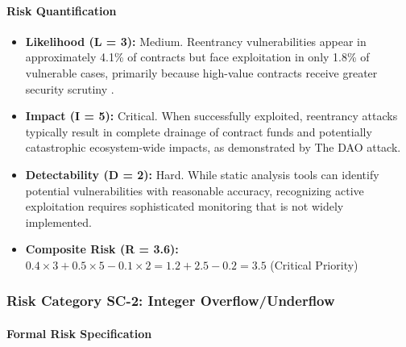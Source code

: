 \paragraph{Risk Quantification}

\begin{itemize}
\item \textbf{Likelihood (L = 3):} Medium. Reentrancy vulnerabilities appear in approximately 4.1\% of contracts but face exploitation in only 1.8\% of vulnerable cases, primarily because high-value contracts receive greater security scrutiny \cite{perez2021analysis}.

\item \textbf{Impact (I = 5):} Critical. When successfully exploited, reentrancy attacks typically result in complete drainage of contract funds and potentially catastrophic ecosystem-wide impacts, as demonstrated by The DAO attack.

\item \textbf{Detectability (D = 2):} Hard. While static analysis tools can identify potential vulnerabilities with reasonable accuracy, recognizing active exploitation requires sophisticated monitoring that is not widely implemented.

\item \textbf{Composite Risk (R = 3.6):} $0.4 \times 3 + 0.5 \times 5 - 0.1 \times 2 = 1.2 + 2.5 - 0.2 = 3.5$ (Critical Priority)
\end{itemize}

\subsubsection{Risk Category SC-2: Integer Overflow/Underflow}

\paragraph{Formal Risk Specification}

